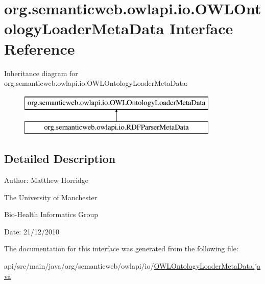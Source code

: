 \hypertarget{interfaceorg_1_1semanticweb_1_1owlapi_1_1io_1_1_o_w_l_ontology_loader_meta_data}{\section{org.\-semanticweb.\-owlapi.\-io.\-O\-W\-L\-Ontology\-Loader\-Meta\-Data Interface Reference}
\label{interfaceorg_1_1semanticweb_1_1owlapi_1_1io_1_1_o_w_l_ontology_loader_meta_data}
}
Inheritance diagram for org.\-semanticweb.\-owlapi.\-io.\-O\-W\-L\-Ontology\-Loader\-Meta\-Data\-:\begin{figure}[H]
\begin{center}
\leavevmode
\includegraphics[height=2.000000cm]{interfaceorg_1_1semanticweb_1_1owlapi_1_1io_1_1_o_w_l_ontology_loader_meta_data}
\end{center}
\end{figure}


\subsection{Detailed Description}
Author\-: Matthew Horridge\par
 The University of Manchester\par
 Bio-\/\-Health Informatics Group\par
 Date\-: 21/12/2010 

The documentation for this interface was generated from the following file\-:\begin{DoxyCompactItemize}
\item 
api/src/main/java/org/semanticweb/owlapi/io/\hyperlink{_o_w_l_ontology_loader_meta_data_8java}{O\-W\-L\-Ontology\-Loader\-Meta\-Data.\-java}\end{DoxyCompactItemize}
